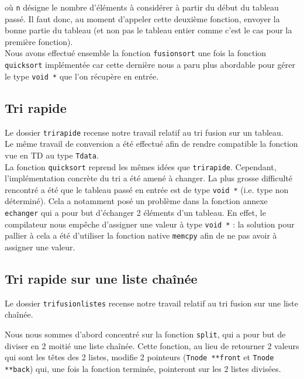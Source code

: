 \documentclass[11pt]{article}
\begin{document}
où \texttt{n} désigne le nombre d'éléments à considérer à partir du début du tableau passé. Il faut donc, au moment d'appeler cette deuxième fonction, envoyer la bonne partie du tableau (et non pas le tableau entier comme c'est le cas pour la première fonction). \\

Nous avons effectué ensemble la fonction \texttt{fusionsort} une fois la fonction \texttt{quicksort} implémentée car cette dernière nous a paru plus abordable pour gérer le type \texttt{void *} que l'on récupère en entrée.

\subsection{Tri rapide}

\quad \quad Le dossier \texttt{tri\textunderscore rapide} recense notre travail relatif au tri fusion sur un tableau. \\

Le même travail de conversion a été effectué afin de rendre compatible la fonction vue en TD au type \texttt{T\textunderscore data}. \\


La fonction \texttt{quicksort} reprend les mêmes idées que \texttt{tri\textunderscore rapide}. Cependant, l'implémentation concrète du tri a été amené à changer. La plus grosse difficulté rencontré a été que le tableau passé en entrée est de type \texttt{void *} (i.e. type non déterminé).
Cela a notamment posé un problème dans la fonction annexe \texttt{echanger} qui a pour but d'échanger 2 éléments d'un tableau. En effet, le compilateur nous empêche d'assigner une valeur à type \texttt{void *} : la solution pour pallier à cela a été d'utiliser la fonction native \texttt{memcpy} afin de ne pas avoir à assigner une valeur. 

\subsection{Tri rapide sur une liste chaînée}

\quad \quad Le dossier \texttt{tri\textunderscore fusion\textunderscore listes} recense notre travail relatif au tri fusion sur une liste chaînée.

Nous nous sommes d'abord concentré sur la fonction \texttt{split}, qui a pour but de diviser en 2 moitié une liste chaînée. Cette fonction, au lieu de retourner 2 valeurs qui sont les têtes des 2 listes, modifie 2 pointeurs (\texttt{T\textunderscore node **front} et \texttt{T\textunderscore node **back}) qui, une fois la fonction terminée, pointeront sur les 2 listes divisées.
\end{document}
